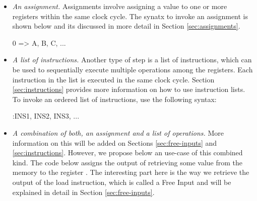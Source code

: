 \begin{itemize}

\item \textit{An assignment.} Assignments involve assigning a value to one or more registers within the same clock cycle. The synatx to invoke an assignment is shown below and its discussed in more detail in Section \ref{sec:assignments}. 

\begin{zkasm}
0 => A, B, C, ...
\end{zkasm}

\item \textit{A list of instructions.} Another type of step is a list of instructions, which can be used to sequentially execute multiple operations among the registers. Each instruction in the list is executed in the same clock cycle. Section \ref{sec:instructions} provides more information on how to use instruction lists. To invoke an ordered list of instructions, use the following syntax:

\begin{zkasm}
                :INS1, INS2, INS3, ...
\end{zkasm}

\item \textit{A combination of both, an assignment and a list of operations.} More information on this will be added on Sections \ref{sec:free-inputs} and \ref{sec:instructions}. However, we propose below an use-case of this combined kind. The code below assigns the output of retrieving some value from the memory to the register \A. The interesting part here is the way we retrieve the output of the load instruction, which is called a Free Input and will be explained in detail in Section \ref{sec:free-inputs}.


\end{itemize}


